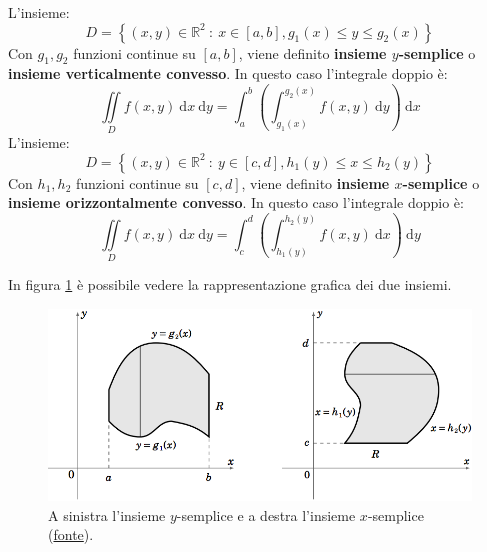 \documentclass[a4paper]{article}
\newcommand{\definition}[1]{\textcolor{Red3}{\textbf{#1}}}
\begin{document}
	\begin{boxdef}
		L'insieme:
		\begin{equation}\label{eq: insieme y-semplice}
			D = \left\{\left(x,y\right) \in \mathbb{R}^{2} \: : \: x \in \left[a,b\right], g_{1}\left(x\right) \le y \le g_{2}\left(x\right)\right\}
		\end{equation}
		Con $g_{1},g_{2}$ funzioni continue su $\left[a,b\right]$, viene definito \definition{insieme $y$-semplice} o \textbf{insieme verticalmente convesso}. In questo caso l'integrale doppio è:
		\begin{equation}\label{eq: formula integrale doppio y-semplice}
			\displaystyle \iint \limits_{D} f\left(x,y\right) \:\mathrm{d}x\:\mathrm{d}y = \int_{a}^{b} \left(\int_{g_{1}\left(x\right)}^{g_{2}\left(x\right)} f\left(x,y\right) \:\mathrm{d}y\right) \:\mathrm{d}x
		\end{equation}
		L'insieme:
		\begin{equation}\label{eq: insieme x-semplice}
			D = \left\{\left(x,y\right) \in \mathbb{R}^{2} \: : \: y \in \left[c,d\right], h_{1}\left(y\right) \le x \le h_{2}\left(y\right)\right\}
		\end{equation}
		Con $h_{1},h_{2}$ funzioni continue su $\left[c,d\right]$, viene definito \definition{insieme $x$-semplice} o \textbf{insieme orizzontalmente convesso}. In questo caso l'integrale doppio è:
		\begin{equation}\label{eq: formula integrale doppio x-semplice}
			\displaystyle \iint \limits_{D} f\left(x,y\right) \:\mathrm{d}x\:\mathrm{d}y = \int_{c}^{d} \left(\int_{h_{1}\left(y\right)}^{h_{2}\left(y\right)} f\left(x,y\right) \:\mathrm{d}x\right) \:\mathrm{d}y
		\end{equation}
	\end{boxdef}

	\noindent
	In figura \ref{fig: insieme x e y semplice} è possibile vedere la rappresentazione grafica dei due insiemi.
	
	\newpage

	\begin{figure}[!htp]
		\centering
		\includegraphics[width=.8\textwidth]{img/integrali_doppi_regione_generale.png}
		\caption{A sinistra l'insieme $y$-semplice e a destra l'insieme $x$-semplice (\href{http://tinyurl.com/mv34tp62}{fonte}).}
		\label{fig: insieme x e y semplice}
	\end{figure}
\end{document}
